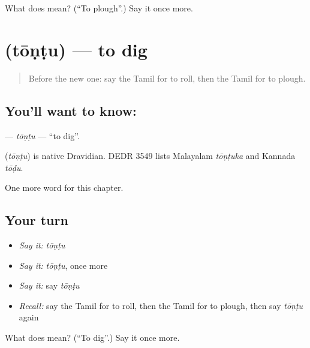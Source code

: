 \begin{tcolorbox}[breakable,colback=teal!4,colframe=teal!35!black,title={Before you move on}]
What does  mean? (\textquotedblleft{}To plough\textquotedblright{}.) Say it once more.
\end{tcolorbox}
\section[\texorpdfstring{\ta{தோண்டு} (tōṇṭu)}{தோண்டு (tōṇṭu)}]{ (tōṇṭu) — to dig}

\label{lesson:TA-C168-tontu}



\begin{quote}
Before the new one: say the Tamil for to roll, then the Tamil for to plough.
\end{quote}

\subsection*{You'll want to know: }
\textbf{} — \emph{tōṇṭu} — \textquotedblleft{}to dig\textquotedblright{}.

\begin{cousinweb}
\textbf{} (\emph{tōṇṭu}) is native Dravidian. DEDR 3549 lists Malayalam \emph{tōṇṭuka} and Kannada \emph{tōḍu}.
\end{cousinweb}

\begin{grammarlens}[title={What you've built}]
One more word for this chapter.
\end{grammarlens}

\subsection*{Your turn}
\begin{itemize}
\raggedright
  \item \emph{Say it:} \emph{tōṇṭu}
  \item \emph{Say it:} \emph{tōṇṭu}, once more
  \item \emph{Say it:} say \emph{tōṇṭu}
  \item \emph{Recall:} say the Tamil for to roll, then the Tamil for to plough, then say \emph{tōṇṭu} again
\end{itemize}

\begin{tcolorbox}[breakable,colback=teal!4,colframe=teal!35!black,title={Before you move on}]
What does  mean? (\textquotedblleft{}To dig\textquotedblright{}.) Say it once more.
\end{tcolorbox}
